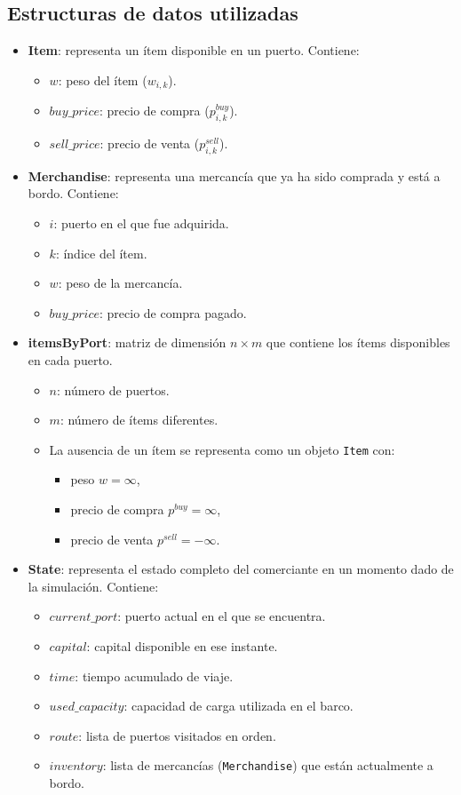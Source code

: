 \documentclass[12pt, a4paper]{article}
\begin{document}
\subsection{Estructuras de datos utilizadas}
\begin{itemize}
    \item \textbf{Item}: representa un ítem disponible en un puerto. Contiene:
    \begin{itemize}
        \item $w$: peso del ítem ($w_{i,k}$).
        \item $buy\_price$: precio de compra ($p_{i,k}^{buy}$).
        \item $sell\_price$: precio de venta ($p_{i,k}^{sell}$).
    \end{itemize}
    \item \textbf{Merchandise}: representa una mercancía que ya ha sido comprada y está a bordo. Contiene:
    \begin{itemize}
        \item $i$: puerto en el que fue adquirida.
        \item $k$: índice del ítem.
        \item $w$: peso de la mercancía.
        \item $buy\_price$: precio de compra pagado.
    \end{itemize}
    \item \textbf{itemsByPort}: matriz de dimensión $n \times m$ que contiene los ítems disponibles en cada puerto.
    \begin{itemize}
        \item $n$: número de puertos.
        \item $m$: número de ítems diferentes.
        \item La ausencia de un ítem se representa como un objeto \texttt{Item} con:
        \begin{itemize}
            \item peso $w = \infty$,
            \item precio de compra $p^{buy} = \infty$,
            \item precio de venta $p^{sell} = -\infty$.
        \end{itemize}
    \end{itemize}
    \item \textbf{State}: representa el estado completo del comerciante en un momento dado de la simulación. Contiene:
    \begin{itemize}
        \item $current\_port$: puerto actual en el que se encuentra.
        \item $capital$: capital disponible en ese instante.
        \item $time$: tiempo acumulado de viaje.
        \item $used\_capacity$: capacidad de carga utilizada en el barco.
        \item $route$: lista de puertos visitados en orden.
        \item $inventory$: lista de mercancías (\texttt{Merchandise}) que están actualmente a bordo.
    \end{itemize}
\end{itemize}
\end{document}
